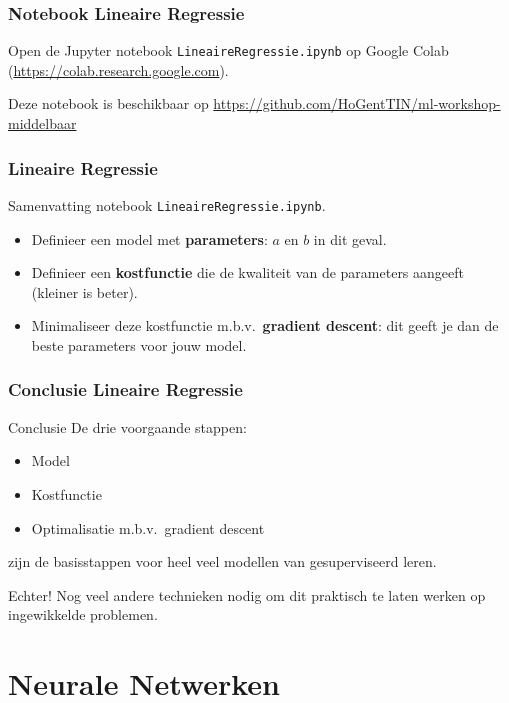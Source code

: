 \documentclass[aspectratio=169]{beamer}
\begin{document}
\begin{frame}
\frametitle{Notebook Lineaire Regressie}

Open de Jupyter notebook  \texttt{LineaireRegressie.ipynb} op Google Colab 
(\url{https://colab.research.google.com}).

\vspace{0.5cm}

Deze notebook is beschikbaar op \url{https://github.com/HoGentTIN/ml-workshop-middelbaar}

\end{frame}

\begin{frame}
\frametitle{Lineaire Regressie}

Samenvatting notebook \texttt{LineaireRegressie.ipynb}.

\vspace{0.5cm}

\begin{itemize}
\item Definieer een model met \textbf{parameters}: $a$ en $b$ in dit geval.
\item Definieer een \textbf{kostfunctie} die de kwaliteit van de parameters aangeeft (kleiner is beter).
\item Minimaliseer deze kostfunctie m.b.v.\ \textbf{gradient descent}: dit geeft je dan de beste parameters voor jouw model.
\end{itemize}

\end{frame}

\begin{frame}
\frametitle{Conclusie Lineaire Regressie}

\begin{block}{Conclusie}
	De drie voorgaande stappen:
	\begin{itemize}
		\item Model
		\item Kostfunctie
		\item Optimalisatie m.b.v.\ gradient descent
	\end{itemize}
    zijn de basisstappen voor heel veel modellen van gesuperviseerd leren.
\end{block}

Echter! Nog veel andere technieken nodig om dit praktisch te laten werken op ingewikkelde problemen.

\end{frame}

\section{Neurale Netwerken}
\end{document}
